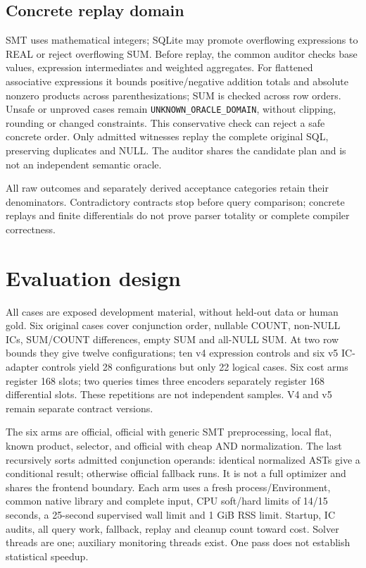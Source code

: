 \documentclass[3p,times,authoryear]{elsarticle}
\begin{document}
\subsection{Concrete replay domain}\label{sec:oracle}
SMT uses mathematical integers; SQLite may promote overflowing expressions to REAL or reject overflowing SUM. Before replay, the common auditor checks base values, expression intermediates and weighted aggregates. For flattened associative expressions it bounds positive/negative addition totals and absolute nonzero products across parenthesizations; SUM is checked across row orders. Unsafe or unproved cases remain \texttt{UNKNOWN\_ORACLE\_DOMAIN}, without clipping, rounding or changed constraints. This conservative check can reject a safe concrete order. Only admitted witnesses replay the complete original SQL, preserving duplicates and NULL. The auditor shares the candidate plan and is not an independent semantic oracle.

All raw outcomes and separately derived acceptance categories retain their denominators. Contradictory contracts stop before query comparison; concrete replays and finite differentials do not prove parser totality or complete compiler correctness.

\section{Evaluation design}\label{sec:evaluation}
All cases are exposed development material, without held-out data or human gold. Six original cases cover conjunction order, nullable COUNT, non-NULL ICs, SUM/COUNT differences, empty SUM and all-NULL SUM. At two row bounds they give twelve configurations; ten v4 expression controls and six v5 IC-adapter controls yield 28 configurations but only 22 logical cases. Six cost arms register 168 slots; two queries times three encoders separately register 168 differential slots. These repetitions are not independent samples. V4 and v5 remain separate contract versions.

The six arms are official, official with generic SMT preprocessing, local flat, known product, selector, and official with cheap AND normalization. The last recursively sorts admitted conjunction operands: identical normalized ASTs give a conditional result; otherwise official fallback runs. It is not a full optimizer and shares the frontend boundary. Each arm uses a fresh process/Environment, common native library and complete input, CPU soft/hard limits of 14/15 seconds, a 25-second supervised wall limit and 1 GiB RSS limit. Startup, IC audits, all query work, fallback, replay and cleanup count toward cost. Solver threads are one; auxiliary monitoring threads exist. One pass does not establish statistical speedup.
\end{document}
